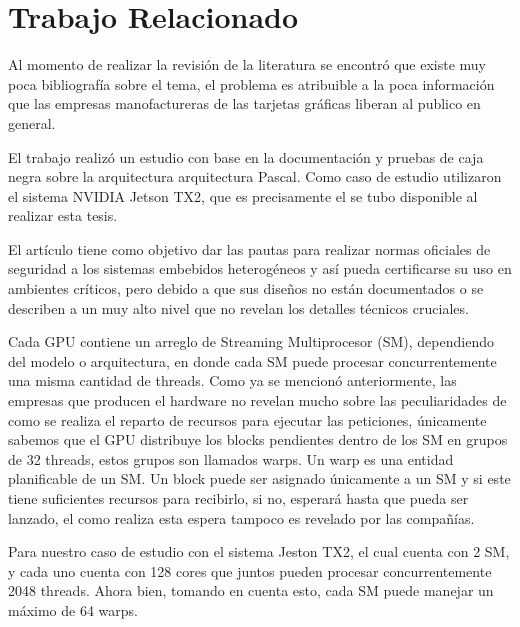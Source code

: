  \chapter{Trabajo Relacionado}
    \label{cha:TrabajoRelacionado}
    
Al momento de realizar la revisión de la literatura se encontró que existe muy poca bibliografía sobre el tema, el problema es atribuible a la poca información que las empresas manofactureras de las tarjetas gráficas liberan al publico en general.
\newline

El trabajo \cite{TX2-H} realizó un estudio con base en la documentación y pruebas de caja negra sobre la arquitectura arquitectura Pascal. Como caso de estudio utilizaron el sistema NVIDIA Jetson TX2, que es precisamente el se tubo disponible al realizar esta tesis.
\newline

El artículo tiene como objetivo dar las pautas para realizar normas oficiales de seguridad a los sistemas embebidos heterogéneos y así pueda certificarse su uso en ambientes críticos, pero  debido a que sus diseños no están documentados o se describen a un muy alto nivel que no revelan los detalles técnicos cruciales.
\newline

Cada GPU contiene un arreglo de Streaming Multiprocesor (SM), dependiendo del modelo o arquitectura, en donde cada SM puede procesar concurrentemente una misma cantidad de threads. Como ya se mencionó anteriormente, las empresas que producen el hardware no revelan mucho sobre las peculiaridades de como se realiza el reparto de recursos para ejecutar las peticiones, únicamente sabemos que el GPU distribuye los blocks pendientes dentro de los SM en grupos de 32 threads, estos grupos son llamados warps. Un warp es una entidad planificable de un SM.
Un block puede ser asignado únicamente a un SM y si este tiene suficientes recursos para recibirlo, si no, esperará hasta que pueda ser lanzado, el como realiza esta espera tampoco es revelado por las compañías.
\newline

Para nuestro caso de estudio con el sistema Jeston TX2, el cual cuenta con 2 SM, y cada uno cuenta con 128 cores que juntos pueden procesar concurrentemente 2048 threads\cite{SMJetson}. Ahora bien, tomando en cuenta esto, cada SM puede manejar un máximo de 64 warps.
\newline

